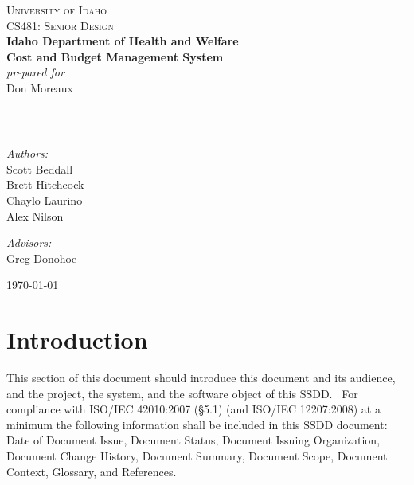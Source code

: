 \documentclass[letterpaper]{article}
\newcommand{\HRule}{\rule{5cm}{0.1mm}}
\begin{document}
\begin{center}



\textsc{\Large University of Idaho}\\[0.2cm]

\textsc{\Large CS481: Senior Design}\\[2cm]


{ \LARGE \bfseries Idaho Department of Health and Welfare}\\[0.4cm]
{ \huge \bfseries Cost and Budget Management System}\\[1.0cm]
{ \normalsize \emph{ prepared for}}\\[0.5cm]
{ \normalsize Don Moreaux}\\[0.5cm]
\HRule \\[3cm]

\begin{minipage}{0.4\textwidth}
\begin{flushleft} \large
\emph{Authors:}\\
Scott Beddall\\
Brett Hitchcock\\
Chaylo Laurino\\
Alex Nilson
\end{flushleft}
\end{minipage}
\begin{minipage}{0.4\textwidth}
\begin{flushright} \large
\emph{Advisors:} \\
Greg Donohoe\\
\bigskip
\bigskip
\bigskip
\bigskip
\end{flushright}
\end{minipage}

\vfill

{\large \today}

\end{center}
\pagebreak
\tableofcontents
\pagebreak
\section{\bfseries{Introduction}}
This section of this document should introduce this document and its
audience, and the project, the system, and the software object of this
SSDD. \ For compliance with ISO/IEC 42010:2007 (§5.1) (and ISO/IEC
12207:2008) at a minimum the following information shall be included in
this SSDD document: Date of Document Issue, Document Status, Document
Issuing Organization, Document Change History, Document Summary,
Document Scope, Document Context, Glossary, and References.
\end{document}
